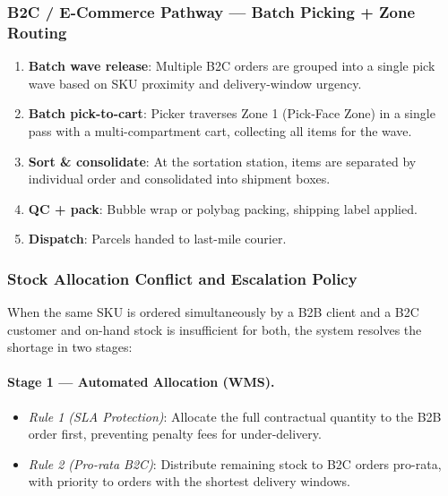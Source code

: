 \documentclass[11pt]{article}
\begin{document}
\subsubsection{B2C / E-Commerce Pathway — Batch Picking + Zone Routing}\label{b2c-path}
\begin{enumerate}
    \item \textbf{Batch wave release}: Multiple B2C orders are grouped into a single
          pick wave based on SKU proximity and delivery-window urgency.
    \item \textbf{Batch pick-to-cart}: Picker traverses Zone 1 (Pick-Face Zone) in a
          single pass with a multi-compartment cart, collecting all items for the wave.
    \item \textbf{Sort \& consolidate}: At the sortation station, items are separated
          by individual order and consolidated into shipment boxes.
    \item \textbf{QC + pack}: Bubble wrap or polybag packing, shipping label applied.
    \item \textbf{Dispatch}: Parcels handed to last-mile courier.
\end{enumerate}

\subsubsection{Stock Allocation Conflict and Escalation Policy}\label{conflict}

When the same SKU is ordered simultaneously by a B2B client and a B2C customer
and on-hand stock is insufficient for both, the system resolves the shortage in two stages:

\paragraph{Stage 1 — Automated Allocation (WMS).}
\begin{itemize}
    \item \textit{Rule 1 (SLA Protection)}: Allocate the full contractual quantity to
          the B2B order first, preventing penalty fees for under-delivery.
    \item \textit{Rule 2 (Pro-rata B2C)}: Distribute remaining stock to B2C orders
          pro-rata, with priority to orders with the shortest delivery windows.
\end{itemize}
\end{document}
